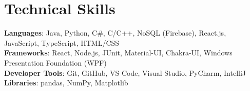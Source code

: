 \documentclass[letterpaper,11pt]{article}
\begin{document}
%
\section{Technical Skills}
 \begin{itemize}[leftmargin=0.15in, label={}]
    \small{\item{
     \textbf{Languages}{: Java, Python, C\#, C/C++, NoSQL (Firebase), React.js, JavaScript, TypeScript, HTML/CSS} \\
     \textbf{Frameworks}{: React, Node.js, JUnit, Material-UI, Chakra-UI, Windows Presentation Foundation (WPF)} \\
     \textbf{Developer Tools}{: Git, GitHub, VS Code, Visual Studio, PyCharm, IntelliJ} \\
     \textbf{Libraries}{: pandas, NumPy, Matplotlib}
    }}
 \end{itemize}


\end{document}
